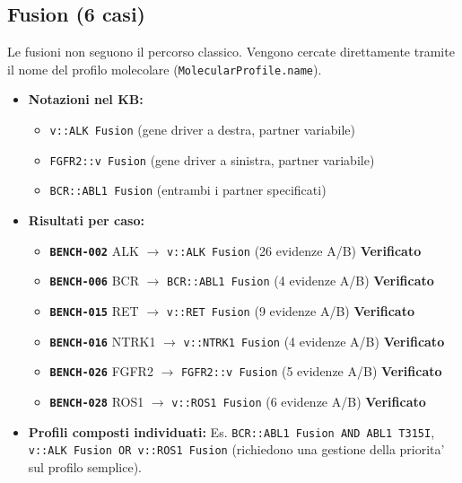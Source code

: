 \documentclass[12pt, a4paper]{article}
\newcommand{\pass}[1]{{\color{passgreen}\textbf{#1}}}
\newcommand{\bench}[1]{{\texttt{\textbf{#1}}}}
\begin{document}
\subsection{Fusion (6 casi)}
Le fusioni non seguono il percorso classico. Vengono cercate direttamente tramite il nome del profilo molecolare (\texttt{MolecularProfile.name}).
\begin{itemize}[leftmargin=1.6em, itemsep=2pt]
  \item \textbf{Notazioni nel KB:}
    \begin{itemize}[leftmargin=1.2em, itemsep=1pt]
      \item \texttt{v::ALK Fusion} (gene driver a destra, partner variabile)
      \item \texttt{FGFR2::v Fusion} (gene driver a sinistra, partner variabile)
      \item \texttt{BCR::ABL1 Fusion} (entrambi i partner specificati)
    \end{itemize}
  \item \textbf{Risultati per caso:}
    \begin{itemize}[leftmargin=1.2em, itemsep=1pt]
      \item \bench{BENCH-002} ALK $\to$ \texttt{v::ALK Fusion} (26 evidenze A/B) \pass{Verificato}
      \item \bench{BENCH-006} BCR $\to$ \texttt{BCR::ABL1 Fusion} (4 evidenze A/B) \pass{Verificato}
      \item \bench{BENCH-015} RET $\to$ \texttt{v::RET Fusion} (9 evidenze A/B) \pass{Verificato}
      \item \bench{BENCH-016} NTRK1 $\to$ \texttt{v::NTRK1 Fusion} (4 evidenze A/B) \pass{Verificato}
      \item \bench{BENCH-026} FGFR2 $\to$ \texttt{FGFR2::v Fusion} (5 evidenze A/B) \pass{Verificato}
      \item \bench{BENCH-028} ROS1 $\to$ \texttt{v::ROS1 Fusion} (6 evidenze A/B) \pass{Verificato}
    \end{itemize}
  \item \textbf{Profili composti individuati:} Es. \texttt{BCR::ABL1 Fusion AND ABL1 T315I}, \texttt{v::ALK Fusion OR v::ROS1 Fusion} (richiedono una gestione della priorita' sul profilo semplice).
\end{itemize}
\end{document}
